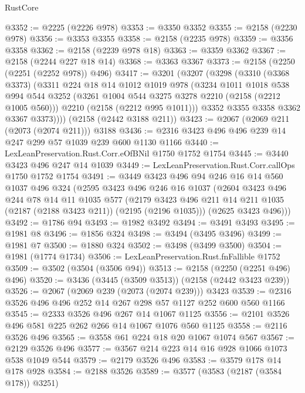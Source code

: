 \begin{lexlean}{RustCore}
\begin{coremodule}
@3352 := @2225 (@2226 @978)
@3353 := @3350 @3352
@3355 := @2158 (@2230 @978)
@3356 := @3353 @3355
@3358 := @2158 (@2235 @978)
@3359 := @3356 @3358
@3362 := @2158 (@2239 @978 @18)
@3363 := @3359 @3362
@3367 := @2158 (@2244 @227 @18 @14)
@3368 := @3363 @3367
@3373 := @2158 (@2250 (@2251 (@2252 @978)) @496)
@3417 := @3201
    (@3207
      (@3298
        (@3310
          (@3368 @3373)
          (@3311
            @224
            @18
            @14
            @1012
            @1019
            @978
            (@3234
              @1011
              @1018
              @538
              @994
              @544
              @3252
              (@3261 @1004 @544 @3275 @3278 @2210 (@2158 (@2212 @1005 @560)))
              @2210
              (@2158 (@2212 @995 @1011)))
            @3352
            @3355
            @3358
            @3362
            @3367
            @3373))))
    (@2158 (@2442 @3188 @211))
@3423 := @2067 (@2069 @211 (@2073 (@2074 @211))) @3188
@3436 := @2316 @3423 @496 @496 @239 @14 @247 @299 @57 @1039 @239 @600 @1130 @1166
@3440 := LexLeanPreservation.Rust.Corr.eOfBNil @1750 @1752 @1754
@3445 := @3440 @3423 @496 @247 @14 @1039
@3449 := LexLeanPreservation.Rust.Corr.callOps @1750 @1752 @1754
@3491 := @3449
    @3423
    @496
    @94
    @246
    @16
    @14
    @560
    @1037
    @496
    @324
    (@2595
      @3423
      @496
      @246
      @16
      @1037
      (@2604
        @3423
        @496
        @244
        @78
        @14
        @11
        @1035
        @577
        (@2179 @3423 @496 @211 @14 @211 @1035 (@2187 (@2188 @3423 @211)) (@2195 (@2196 @1035)))
        (@2625 @3423 @496)))
@3492 := @1786 @94
@3493 := @1982 @3492
@3494 := @3491 @3493
@3495 := @1981 @8
@3496 := @1856 @324
@3498 := @3494 (@3495 @3496)
@3499 := @1981 @7
@3500 := @1880 @324
@3502 := @3498 (@3499 @3500)
@3504 := @1981 (@1774 @1734)
@3506 := LexLeanPreservation.Rust.fnFallible @1752
@3509 := @3502 (@3504 (@3506 @94))
@3513 := @2158 (@2250 (@2251 @496) @496)
@3520 := @3436 (@3445 (@3509 @3513)) (@2158 (@2442 @3423 @239))
@3526 := @2067 (@2069 @239 (@2073 (@2074 @239))) @3423
@3539 := @2316 @3526 @496 @496 @252 @14 @267 @298 @57 @1127 @252 @600 @560 @1166
@3545 := @2333 @3526 @496 @267 @14 @1067 @1125
@3556 := @2101 @3526 @496 @581 @225 @262 @266 @14 @1067 @1076 @560 @1125
@3558 := @2116 @3526 @496
@3565 := @3558 @61 @224 @18 @20 @1067 @1074 @567
@3567 := @2129 @3526 @496
@3577 := @3567 @214 @223 @14 @16 @928 @1066 @1073 @538 @1049 @544
@3579 := @2179 @3526 @496
@3583 := @3579 @178 @14 @178 @928
@3584 := @2188 @3526
@3589 := @3577 (@3583 (@2187 (@3584 @178)) @3251)

\end{coremodule}
\end{lexlean}
